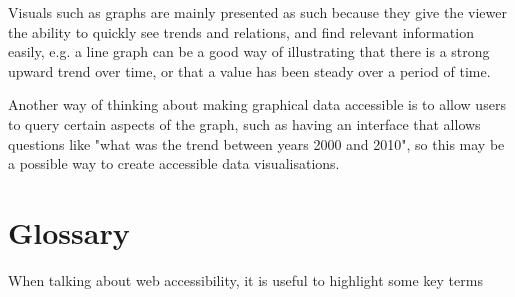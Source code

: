\documentclass[ %
                    author={Aleena Baig},
                supervisor={Dr Simon Lock},
                    degree={BSc},
                     title={On Making Web Accessible Graphs},
                  subtitle={},
                      year={2019} ]{dissertation}
\begin{document}
Visuals such as graphs are mainly presented as such because they give the viewer the ability to quickly see trends and relations, and find relevant information easily, e.g. a line graph can be a good way of illustrating that there is a strong upward trend over time, or that a value has been steady over a period of time.

Another way of thinking about making graphical data accessible is to allow users to query certain aspects of the graph, such as having an interface that allows questions like "what was the trend between years 2000 and 2010", so this may be a possible way to create accessible data visualisations.


\chapter{Glossary}


When talking about web accessibility, it is useful to highlight some key terms

\BlankLine
%
\glsaddall
\printglossary[nonumberlist]

\printbibliography


\end{document}

